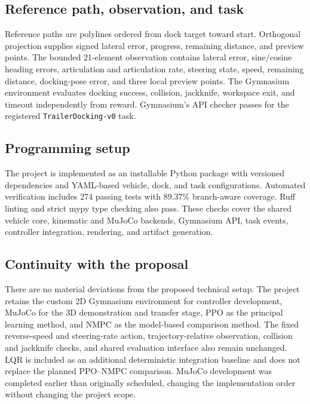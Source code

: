 \documentclass[conference]{IEEEtran}
\begin{document}
\subsection{Reference path, observation, and task}

Reference paths are polylines ordered from dock target toward start.
Orthogonal projection supplies signed lateral error, progress, remaining
distance, and preview points. The bounded 21-element observation contains
lateral error, sine/cosine heading errors, articulation and articulation rate,
steering state, speed, remaining distance, docking-pose error, and three local
preview points. The Gymnasium environment evaluates docking success,
collision, jackknife, workspace exit, and timeout independently from reward.
Gymnasium's API checker passes for the registered \texttt{TrailerDocking-v0}
task.

\subsection{Programming setup}

The project is implemented as an installable Python package with versioned
dependencies and YAML-based vehicle, dock, and task configurations. Automated
verification includes 274 passing tests with $89.37\%$ branch-aware coverage.
Ruff linting and strict mypy type checking also pass. These checks cover the
shared vehicle core, kinematic and MuJoCo backends, Gymnasium API, task events,
controller integration, rendering, and artifact generation.

\subsection{Continuity with the proposal}

There are no material deviations from the proposed technical setup. The
project retains the custom 2D Gymnasium environment for controller development,
MuJoCo for the 3D demonstration and transfer stage, PPO as the principal
learning method, and NMPC as the model-based comparison method. The fixed
reverse-speed and steering-rate action, trajectory-relative observation,
collision and jackknife checks, and shared evaluation interface also remain
unchanged. LQR is included as an additional deterministic integration baseline
and does not replace the planned PPO--NMPC comparison. MuJoCo development was
completed earlier than originally scheduled, changing the implementation order
without changing the project scope.
\end{document}
